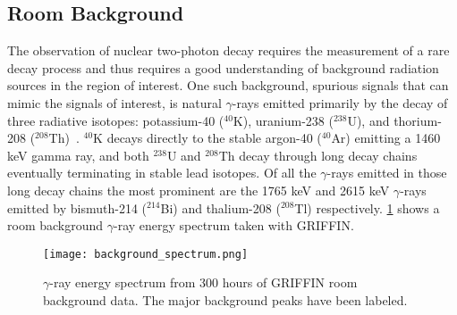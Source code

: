 \documentclass[cnatzke_thesis_proposal.tex]{subfiles}
\begin{document}
\subsection{Room Background}
\label{sec:room_background}
The observation of nuclear two-photon decay requires the measurement of a rare decay process and thus requires a good understanding of background radiation sources in the region of interest. 
One such background, spurious signals that can mimic the signals of interest, is natural $\gamma$-rays emitted primarily by the decay of three radiative isotopes: potassium-40 ($^{40}$K), uranium-238 ($^{238}$U), and thorium-208 ($^{208}$Th)~\cite[]{aksoy_elemental_1994}.
$^{40}$K decays directly to the stable argon-40 ($^{40}$Ar) emitting a 1460 keV gamma ray, and both $^{238}$U and $^{208}$Th decay through long decay chains eventually terminating in stable lead isotopes. 
Of all the $\gamma$-rays emitted in those long decay chains the most prominent are the 1765 keV and 2615 keV $\gamma$-rays emitted by bismuth-214 ($^{214}$Bi) and thalium-208 ($^{208}$Tl) respectively.
\ref{fig:background_spectrum} shows a room background $\gamma$-ray energy spectrum taken with GRIFFIN.

\begin{figure}[htbp]
  \centering
  \texttt{[image: background\_spectrum.png]}
  \caption{$\gamma$-ray energy spectrum from 300 hours of GRIFFIN room background data. The major background peaks have been labeled.}
  \label{fig:background_spectrum}
\end{figure}

\end{document}
